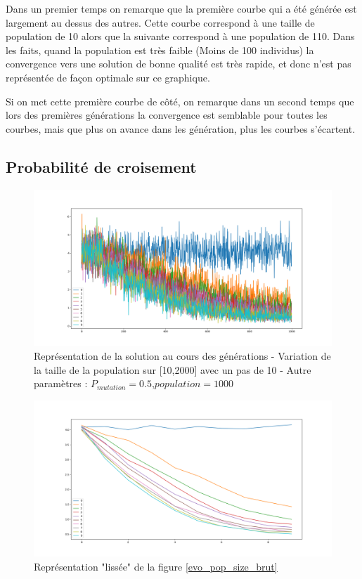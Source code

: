 \documentclass[12pt]{report}
\begin{document}
        Dans un premier temps on remarque que la première courbe qui a été générée est largement au dessus des autres. Cette courbe correspond à une taille de population de 10 alors que la suivante correspond à une population de 110. Dans les faits, quand la population est très faible (Moins de 100 individus) la convergence vers une solution de bonne qualité est très rapide, et donc n'est pas représentée de façon optimale sur ce graphique.

        Si on met cette première courbe de côté, on remarque dans un second temps que lors des premières générations la convergence est semblable pour toutes les courbes, mais que plus on avance dans les génération, plus les courbes s'écartent.



      \subsection{Probabilité de croisement}

      \begin{figure}[h]
        \centering
        \includegraphics[width=15cm]{img/evo_crossover_brut.png}
        \caption{Représentation de la solution au cours des générations - Variation de la taille de la population sur [10,2000] avec un pas de 10 - Autre paramètres : $P_{mutation} = 0.5$,$population = 1000$}
        \label{evo_crossover_brut}
      \end{figure}

      \begin{figure}[!]
        \centering
        \includegraphics[width=15cm]{img/evo_crossover_moy.png}
        \caption{Représentation "lissée" de la figure \ref{evo_pop_size_brut}}
        \label{evo_crossover_moy}
      \end{figure}
\end{document}
